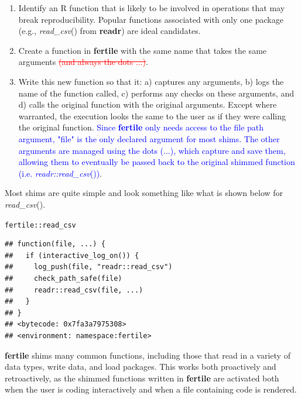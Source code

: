 \documentclass[APA,LATO1COL]{WileyNJD-v2}\usepackage[]{graphicx}\usepackage[]{color}
\makeatletter
\newcommand{\hlopt}[1]{\textcolor[rgb]{0,0,0}{#1}}%
\newcommand{\hlstd}[1]{\textcolor[rgb]{0.345,0.345,0.345}{#1}}%
\newenvironment{kframe}{%
 \def\at@end@of@kframe{}%
 \ifinner\ifhmode%
  \def\at@end@of@kframe{\end{minipage}}%
  \begin{minipage}{\columnwidth}%
 \fi\fi%
 \def\FrameCommand##1{\hskip\@totalleftmargin \hskip-\fboxsep
 \colorbox{shadecolor}{##1}\hskip-\fboxsep
     \hskip-\linewidth \hskip-\@totalleftmargin \hskip\columnwidth}%
 \MakeFramed {\advance\hsize-\width
   \@totalleftmargin\z@ \linewidth\hsize
   \@setminipage}}%
 {\par\unskip\endMakeFramed%
 \at@end@of@kframe}
\newenvironment{knitrout}{}{} %
\newcommand{\R}{\textsf{R}\xspace}
\newcommand{\pkg}[1]{\textbf{#1}}
\newcommand{\func}[1]{\textit{#1}()}
\makeatother
\begin{document}
\begin{enumerate}[noitemsep]
\item Identify an \R function that is likely to be involved in operations that may break reproducibility. Popular functions associated with only one package (e.g., \func{read\_csv} from \pkg{readr}) are ideal candidates.
\item Create a function in \pkg{fertile} with the same name that takes the same arguments \textcolor{red}{\st{(and always the dots ...)}}.
\item Write this new function so that it: a) captures any arguments, b) logs the name of the function called, c) performs any checks on these arguments, and d) calls the original function with the original arguments. Except where warranted, the execution looks the same to the user as if they were calling the original function. \textcolor{blue}{Since \pkg{fertile} only needs access to the file path argument, "file" is the only declared argument for most shims. The other arguments are managed using the dots (...), which capture and save them, allowing them to eventually be passed back to the original shimmed function (i.e. \func{readr::read\_csv})}.

\end{enumerate}
Most shims are quite simple and look something like what is shown below for \func{read\_csv}. 

\begin{knitrout}
\color{fgcolor}\begin{kframe}
\begin{alltt}
\hlstd{fertile}\hlopt{::}\hlstd{read_csv}
\end{alltt}
\begin{verbatim}
## function(file, ...) {
##   if (interactive_log_on()) {
##     log_push(file, "readr::read_csv")
##     check_path_safe(file)
##     readr::read_csv(file, ...)
##   }
## }
## <bytecode: 0x7fa3a7975308>
## <environment: namespace:fertile>
\end{verbatim}
\end{kframe}
\end{knitrout}

\pkg{fertile} shims many common functions, including those that read in a variety of data types, write data, and load packages. This works both proactively and retroactively, as the shimmed functions written in \pkg{fertile} are activated both when the user is coding interactively and when a file containing code is rendered.
\end{document}
